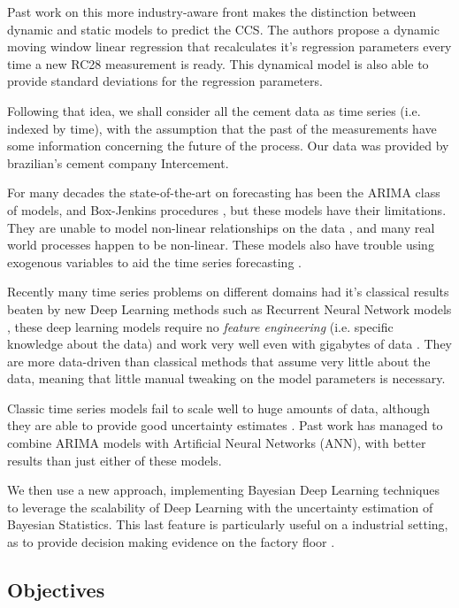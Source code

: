 \documentclass[a4paper]{article}
\begin{document}
Past work on this more industry-aware front \cite{greciaLin} makes the distinction between dynamic and static models to predict the CCS. 
The authors propose a dynamic moving window linear regression that recalculates it's regression parameters every time a new RC28 measurement is ready. 
This dynamical model is also able to provide standard deviations for the regression parameters.

Following that idea, we shall consider all the cement data as time series (i.e. indexed by time), 
with the assumption that the past of the measurements have some information concerning the future of the process.
Our data was provided by brazilian's cement company Intercement.   

For many decades the state-of-the-art on forecasting has been the ARIMA class of models, and Box-Jenkins procedures \cite{inbook}, but these models have their limitations. 
They are unable to model non-linear relationships on the data \cite{forecasting}, and many real world processes happen to be non-linear. These models also have trouble using exogenous variables 
to aid the time series forecasting \cite{ubertime}.

Recently many time series problems on different domains had it's classical results beaten by new Deep Learning methods such as Recurrent Neural Network models \cite{energylstm,lstmbr},
these deep learning models require no \emph{feature engineering} (i.e. specific knowledge about the data) and work very well even with gigabytes of data \cite{ARIMA_LSTM}. 
They are more data-driven than classical methods that assume very little about the data, meaning that little manual tweaking on the model parameters is necessary.

Classic time series models fail to scale well to huge amounts of data, although they are able to provide good uncertainty estimates \cite{deepar}. Past work \cite{DIAZROBLES20088331,KHASHEI2010479} 
has managed to combine ARIMA models with Artificial Neural Networks (ANN), with better results than just either of these models.

We then use a new approach, implementing Bayesian Deep Learning techniques to leverage the scalability of Deep Learning with the uncertainty estimation of Bayesian Statistics. 
This last feature is particularly useful on a industrial setting, as to provide decision making evidence on the factory floor \cite{deepfactors}. 

\subsection{Objectives}
\label{sec:org516287e}
\end{document}

